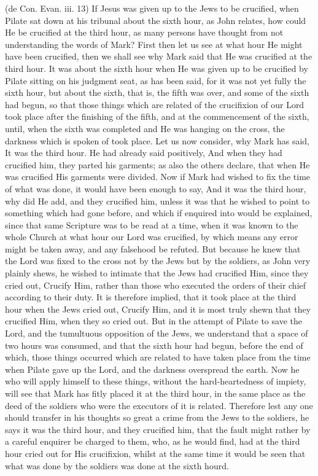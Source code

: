  (de Con. Evan. iii. 13) If Jesus was given up to the Jews to be crucified, when Pilate sat down at his tribunal about the sixth hour, as John relates, how could He be crucified at the third hour, as many persons have thought from not understanding the words of Mark? First then let us see at what hour He might have been crucified, then we shall see why Mark said that He was crucified at the third hour. It was about the sixth hour when He was given up to be crucified by Pilate sitting on his judgment seat, as has been said, for it was not yet fully the sixth hour, but about the sixth, that is, the fifth was over, and some of the sixth had begun, so that those things which are related of the crucifixion of our Lord took place after the finishing of the fifth, and at the commencement of the sixth, until, when the sixth was completed and He was hanging on the cross, the darkness which is spoken of took place. Let us now consider, why Mark has said, It was the third hour. He had already said positively, And when they had crucified him, they parted his garments; as also the others declare, that when He was crucified His garments were divided. Now if Mark had wished to fix the time of what was done, it would have been enough to say, And it was the third hour, why did He add, and they crucified him, unless it was that he wished to point to something which had gone before, and which if enquired into would be explained, since that same Scripture was to be read at a time, when it was known to the whole Church at what hour our Lord was crucified, by which means any error might be taken away, and any falsehood be refuted. But because he knew that the Lord was fixed to the cross not by the Jews but by the soldiers, as John very plainly shews, he wished to intimate that the Jews had crucified Him, since they cried out, Crucify Him, rather than those who executed the orders of their chief according to their duty. It is therefore implied, that it took place at the third hour when the Jews cried out, Crucify Him, and it is most truly shewn that they crucified Him, when they so cried out. But in the attempt of Pilate to save the Lord, and the tumultuous opposition of the Jews, we understand that a space of two hours was consumed, and that the sixth hour had begun, before the end of which, those things occurred which are related to have taken place from the time when Pilate gave up the Lord, and the darkness overspread the earth. Now he who will apply himself to these things, without the hard-heartedness of impiety, will see that Mark has fitly placed it at the third hour, in the same place as the deed of the soldiers who were the executors of it is related. Therefore lest any one should transfer in his thoughts so great a crime from the Jews to the soldiers, he says it was the third hour, and they crucified him, that the fault might rather by a careful enquirer be charged to them, who, as he would find, had at the third hour cried out for His crucifixion, whilst at the same time it would be seen that what was done by the soldiers was done at the sixth hourd.


